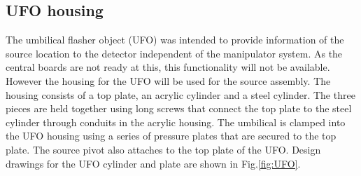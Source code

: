 \documentclass[12pt]{article}
\begin{document}
\subsection{UFO housing}
The umbilical flasher object (UFO) was intended to provide information
of the source location to the detector independent of the manipulator
system. As the central boards are not ready at this, this
functionality will not be available. However the housing for the UFO
will be used for the source assembly. The housing consists of a top
plate, an acrylic cylinder and a steel cylinder. The three pieces are
held together using long screws that connect the top plate to the
steel cylinder through conduits in the acrylic housing. The umbilical
is clamped into the UFO housing using a series of pressure plates that
are secured to the top plate. The source pivot also attaches to the
top plate of the UFO. Design drawings for the UFO cylinder and plate are
shown in Fig.\ref{fig:UFO}.
\end{document}
